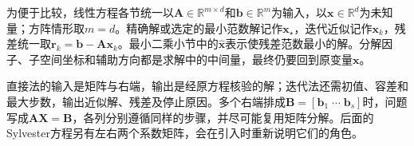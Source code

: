 为便于比较，线性方程各节统一以$\bm A\in\mathbb R^{m\times d}$和$\bm b\in\mathbb R^m$为输入，以$\bm x\in\mathbb R^d$为未知量；方阵情形取$m=d$。精确解或选定的最小范数解记作$\bm x_\star$，迭代近似记作$\bm x_k$，残差统一取$\bm r_k=\bm b-\bm A\bm x_k$。最小二乘小节中的$\hat{\bm x}$表示使残差范数最小的解。分解因子、子空间坐标和辅助方向都是求解中的中间量，最终仍要回到原变量$\bm x$。

直接法的输入是矩阵与右端，输出是经原方程核验的解；迭代法还需初值、容差和最大步数，输出近似解、残差及停止原因。多个右端排成$\bm B=[\bm b_1\;\cdots\;\bm b_s]$时，问题写成$\bm A\bm X=\bm B$，各列分别遵循同样的步骤，并尽可能复用矩阵分解。后面的Sylvester方程另有左右两个系数矩阵，会在引入时重新说明它们的角色。






